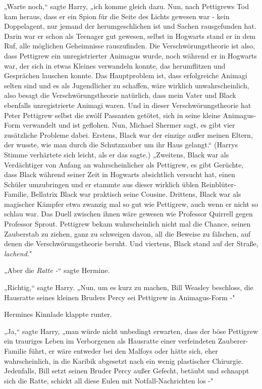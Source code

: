 {„Warte noch,“ sagte Harry, „ich komme gleich dazu. Nun, nach Pettigrews Tod kam heraus, dass er ein Spion für die Seite des Lichts gewesen war - kein Doppelagent, nur jemand der herumgeschlichen ist und Sachen rausgefunden hat. Darin war er schon als Teenager gut gewesen, selbst in Hogwarts stand er in dem Ruf, alle möglichen Geheimnisse rauszufinden. Die Verschwörungstheorie ist also, dass Pettigrew ein unregistrierter Animagus wurde, noch während er in Hogwarts war, der sich in etwas Kleines verwandeln konnte, das herumflitzen und Gesprächen lauschen konnte. Das Hauptproblem ist, dass erfolgreiche Animagi selten sind und es als Jugendlicher zu schaffen, wäre wirklich unwahrscheinlich, also besagt die Verschwörungstheorie natürlich, dass mein Vater und Black ebenfalls unregistrierte Animagi waren. Und in dieser Verschwörungstheorie hat Peter Pettigrew selbst die zwölf Passanten getötet, sich in seine kleine Animagus-Form verwandelt und ist geflohen. Nun, Michael Shermer sagt, es gibt vier zusätzliche Probleme dabei. Erstens, Black war der einzige außer meinen Eltern, der wusste, wie man durch die Schutzzauber um ihr Haus gelangt.“ (Harrys Stimme verhärtete sich leicht, als er das sagte.) „Zweitens, Black war als Verdächtiger von Anfang an wahrscheinlicher als Pettigrew, es gibt Gerüchte, dass Black während seiner Zeit in Hogwarts absichtlich versucht hat, einen Schüler umzubringen und er stammte aus dieser wirklich üblen Reinblüter-Familie, Bellatrix Black war praktisch seine Cousine. Drittens, Black war als magischer Kämpfer etwa zwanzig mal so gut wie Pettigrew, auch wenn er nicht so schlau war. Das Duell zwischen ihnen wäre gewesen wie Professor Quirrell gegen Professor Sprout. Pettigrew bekam wahrscheinlich nicht mal die Chance, seinen Zauberstab zu ziehen, ganz zu schweigen davon, all die Beweise zu fälschen, auf denen die Verschwörungstheorie beruht. Und viertens, Black stand auf der Straße, \emph{lachend.}"

„Aber die \emph{Ratte -}“ sagte Hermine.

„Richtig,“ sagte Harry. „Nun, um es kurz zu machen, Bill Weasley beschloss, die Hausratte seines kleinen Bruders Percy sei Pettigrew in Animagus-Form -"

Hermines Kinnlade klappte runter.

„Ja,“ sagte Harry, „man würde nicht unbedingt erwarten, dass der böse Pettigrew ein trauriges Leben im Verborgenen als Hausratte einer verfeindeten Zauberer-Familie führt, er wäre entweder bei den Malfoys oder hätte sich, eher wahrscheinlich, in die Karibik abgesetzt nach ein wenig plastischer Chirurgie. Jedenfalls, Bill setzt seinen Bruder Percy außer Gefecht, betäubt und schnappt sich die Ratte, schickt all diese Eulen mit Notfall-Nachrichten los -"

}
